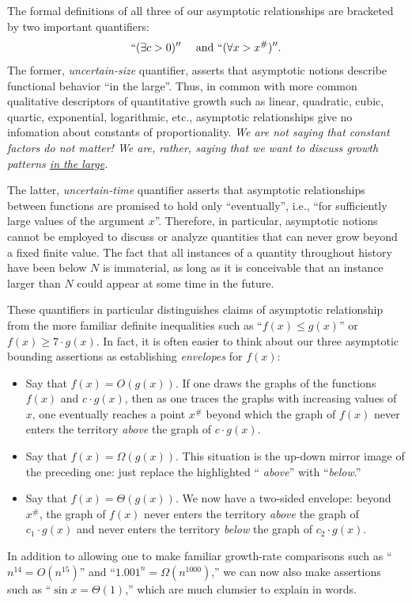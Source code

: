 The formal definitions of all three of our asymptotic relationships
are bracketed by two important quantifiers:
\[ ``(\exists c >0)'' \ \ \ \mbox{ and } 
 ``(\forall x > x^{\#})''.
\]
The former, {\em uncertain-size} quantifier, asserts that asymptotic
notions describe functional behavior ``in the large''.  Thus, in
common with more common qualitative descriptors of quantitative growth
such as linear, quadratic, cubic, quartic, exponential, logarithmic,
etc., asymptotic relationships give no infomation about constants of
proportionality.  {\em We are not saying that constant factors do not
  matter!  We are, rather, saying that we want to discuss growth
  patterns \underline{in the large}.}

The latter, {\em uncertain-time} quantifier asserts that asymptotic
relationships between functions are promised to hold only
``eventually'', i.e., ``for sufficiently large values of the argument
$x$''.  Therefore, in particular, asymptotic notions cannot be
employed to discuss or analyze quantities that can never grow beyond a
fixed finite value.  The fact that all instances of a quantity
throughout history have been below $N$ is immaterial, as long as it is
conceivable that an instance larger than $N$ could appear at some time
in the future.

These quantifiers in particular distinguishes claims of asymptotic
relationship from the more familiar definite inequalities such as
``$f(x) \leq g(x)$'' or $f(x) \geq 7 \cdot g(x)$.  In fact, it is
often easier to think about our three asymptotic bounding assertions
as establishing {\em envelopes} for $f(x)$:
\begin{itemize}
\item
Say that $f(x) = O(g(x))$.  If one draws the graphs of the functions
$f(x)$ and $c \cdot g(x)$, then as one traces the graphs with
increasing values of $x$, one eventually reaches a point $x^{\#}$
beyond which the graph of $f(x)$ never enters the territory {\em
  above} the graph of $c \cdot g(x)$.
\item
Say that $f(x) = \Omega(g(x))$.  This situation is the up-down mirror
image of the preceding one: just replace the highlighted ``{\em
above}'' with ``{\em below}.''
\item
Say that $f(x) = \Theta(g(x))$.  We now have a two-sided envelope:
beyond $x^{\#}$, the graph of $f(x)$ never enters the territory {\em
  above} the graph of $c_1 \cdot g(x)$ and never enters the territory
{\em below} the graph of $c_2 \cdot g(x)$.
\end{itemize}
In addition to allowing one to make familiar growth-rate comparisons
such as ``$n^{14} = O(n^{15})$'' and ``$1.001^n = \Omega(n^{1000})$,''
we can now also make assertions such as ``$\sin x = \Theta(1)$,''
which are much clumsier to explain in words.

